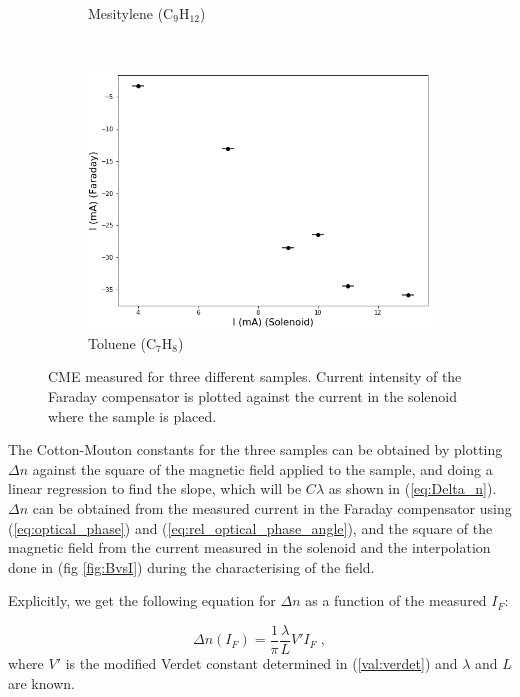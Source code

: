 \documentclass[11pt,a4paper]{article}
\begin{document}
\begin{figure}[H]
\begin{subfigure}[b]{0.45\textwidth}
\caption{Mesitylene (C$_9$H$_{12}$)}
\label{fig:CME_sample2}
\end{subfigure}\\\vspace{.2cm}
\begin{subfigure}[b]{0.45\textwidth}
\includegraphics[width=\textwidth]{sample1}
\caption{Toluene (C$_7$H$_8$)}
\label{fig:CME_sample1}
\end{subfigure}
\caption{CME measured for three different samples. Current intensity of the Faraday compensator is plotted against the current in the solenoid where the sample is placed.}
\label{fig:CME}
\end{figure}

The Cotton-Mouton constants for the three samples can be obtained by plotting $\Delta n$ against the square of the magnetic field applied to the sample, and doing a linear regression to find the slope, which will be $C\lambda$ as shown in (\ref{eq:Delta_n}). $\Delta n$ can be obtained from the measured current in the Faraday compensator using (\ref{eq:optical_phase}) and (\ref{eq:rel_optical_phase_angle}), and the square of the magnetic field from the current measured in the solenoid and the interpolation done in (fig \ref{fig:BvsI}) during the characterising of the field.

Explicitly, we get the following equation for $\Delta n$ as a function of the measured $I_F$:

\begin{equation}\label{eq:delta_n}
\Delta n(I_F)=\frac{1}{\pi}\frac{\lambda}{L}V'I_F\;,
\end{equation}
where $V'$ is the modified Verdet constant determined in (\ref{val:verdet}) and $\lambda$ and $L$ are known.
\end{document}
